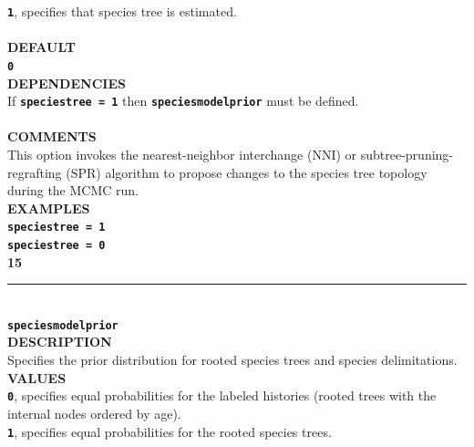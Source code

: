 \documentclass[a4paper]{book}
\numberwithin{equation}{section} \renewcommand{\baselinestretch}{0.55}
\begin{document}
\textbf{\texttt{1}}, specifies that species tree is estimated. \vspace{5pt}\\
\textbf{\texttt{}} \vspace{5pt}\\
\textbf{DEFAULT} \vspace{5pt}\\
\textbf{\texttt{0}} \vspace{5pt}\\
\textbf{DEPENDENCIES} \vspace{5pt}\\
If \textbf{\texttt{speciestree = 1}} then \textbf{\texttt{speciesmodelprior}} must be defined. \vspace{5pt}\\
\vspace{5pt}\\
\textbf{COMMENTS} \vspace{5pt}\\
This option invokes the nearest-neighbor interchange (NNI) or
subtree-pruning-regrafting (SPR) algorithm to propose changes to the
species tree topology during the MCMC run.
\vspace{5pt}\\
\textbf{EXAMPLES} \vspace{5pt}\\
\textbf{\texttt{speciestree = 1}} \vspace{5pt}\\
\textbf{\texttt{speciestree = 0}}\vspace{10pt}\\
\textbf{{\large 15}} \\
\noindent\rule{\textwidth}{0.8pt} \\
\textbf{{\Large \texttt{speciesmodelprior}}} \vspace{5pt}\\
\textbf{DESCRIPTION} \vspace{5pt}\\
Specifies the prior distribution for rooted species trees and species delimitations. \vspace{5pt}\\
\textbf{VALUES} \vspace{5pt}\\
\textbf{\texttt{0}}, specifies equal probabilities for the labeled histories (rooted trees with the internal nodes ordered by age). \vspace{5pt}\\
\textbf{\texttt{1}}, specifies equal probabilities for the rooted species trees. \vspace{5pt}\\
\end{document}

